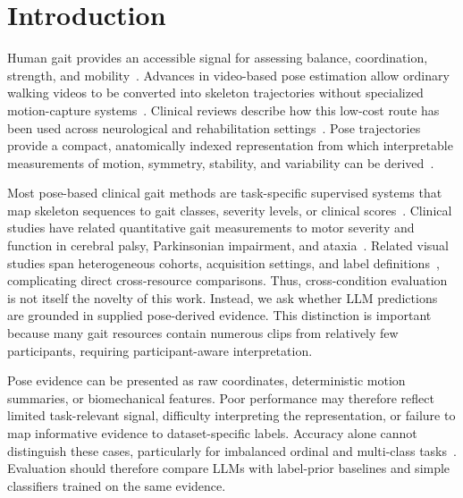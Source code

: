 \section{Introduction}

Human gait provides an accessible signal for assessing balance, coordination, strength, and mobility~\cite{perry1992gait,baker2006gait,muro2014gait}. Advances in video-based pose estimation allow ordinary walking videos to be converted into skeleton trajectories without specialized motion-capture systems~\cite{cao2017openpose,lugaresi2019mediapipe,bazarevsky2020blazepose}. Clinical reviews describe how this low-cost route has been used across neurological and rehabilitation settings~\cite{stenum2021applications,stenum2024clinical}. Pose trajectories provide a compact, anatomically indexed representation from which interpretable measurements of motion, symmetry, stability, and variability can be derived~\cite{winter2009biomechanics,schwartz2008gdi}.

Most pose-based clinical gait methods are task-specific supervised systems that map skeleton sequences to gait classes, severity levels, or clinical scores~\cite{khalil2022ataxia,deng2024parkinsonism}. Clinical studies have related quantitative gait measurements to motor severity and function in cerebral palsy, Parkinsonian impairment, and ataxia~\cite{kidzinski2020video,lu2020updrs,khalil2022ataxia}. Related visual studies span heterogeneous cohorts, acquisition settings, and label definitions~\cite{jun2020pathological,deng2024parkinsonism,khalil2022ataxia}, complicating direct cross-resource comparisons. Thus, cross-condition evaluation is not itself the novelty of this work. Instead, we ask whether LLM predictions are grounded in supplied pose-derived evidence. This distinction is important because many gait resources contain numerous clips from relatively few participants, requiring participant-aware interpretation.

Pose evidence can be presented as raw coordinates, deterministic motion summaries, or biomechanical features. Poor performance may therefore reflect limited task-relevant signal, difficulty interpreting the representation, or failure to map informative evidence to dataset-specific labels. Accuracy alone cannot distinguish these cases, particularly for imbalanced ordinal and multi-class tasks~\cite{opitz2019macro,sokolova2009performance}. Evaluation should therefore compare LLMs with label-prior baselines and simple classifiers trained on the same evidence.

